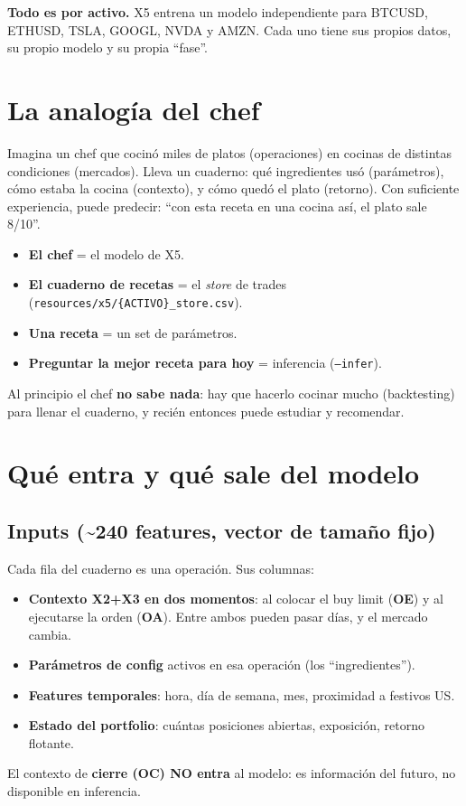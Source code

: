 \documentclass[11pt,a4paper]{article}
\newcommand{\code}[1]{\texttt{#1}}
\begin{document}
\textbf{Todo es por activo.} X5 entrena un modelo independiente para BTCUSD, ETHUSD, TSLA,
GOOGL, NVDA y AMZN. Cada uno tiene sus propios datos, su propio modelo y su propia ``fase''.

\section{La analogía del chef}

Imagina un chef que cocinó miles de platos (operaciones) en cocinas de distintas condiciones
(mercados). Lleva un cuaderno: qué ingredientes usó (parámetros), cómo estaba la cocina
(contexto), y cómo quedó el plato (retorno). Con suficiente experiencia, puede predecir:
``con esta receta en una cocina así, el plato sale 8/10''.

\begin{itemize}[leftmargin=1.4em]
  \item \textbf{El chef} = el modelo de X5.
  \item \textbf{El cuaderno de recetas} = el \emph{store} de trades (\code{resources/x5/\{ACTIVO\}\_store.csv}).
  \item \textbf{Una receta} = un set de parámetros.
  \item \textbf{Preguntar la mejor receta para hoy} = inferencia (\code{--infer}).
\end{itemize}

Al principio el chef \textbf{no sabe nada}: hay que hacerlo cocinar mucho (backtesting) para
llenar el cuaderno, y recién entonces puede estudiar y recomendar.

\section{Qué entra y qué sale del modelo}

\subsection{Inputs (\textasciitilde240 features, vector de tamaño fijo)}

Cada fila del cuaderno es una operación. Sus columnas:
\begin{itemize}[leftmargin=1.4em,itemsep=1pt]
  \item \textbf{Contexto X2+X3 en dos momentos}: al colocar el buy limit (\textbf{OE}) y al
  ejecutarse la orden (\textbf{OA}). Entre ambos pueden pasar días, y el mercado cambia.
  \item \textbf{Parámetros de config} activos en esa operación (los ``ingredientes'').
  \item \textbf{Features temporales}: hora, día de semana, mes, proximidad a festivos US.
  \item \textbf{Estado del portfolio}: cuántas posiciones abiertas, exposición, retorno flotante.
\end{itemize}
El contexto de \textbf{cierre (OC) NO entra} al modelo: es información del futuro, no disponible
en inferencia.
\end{document}
